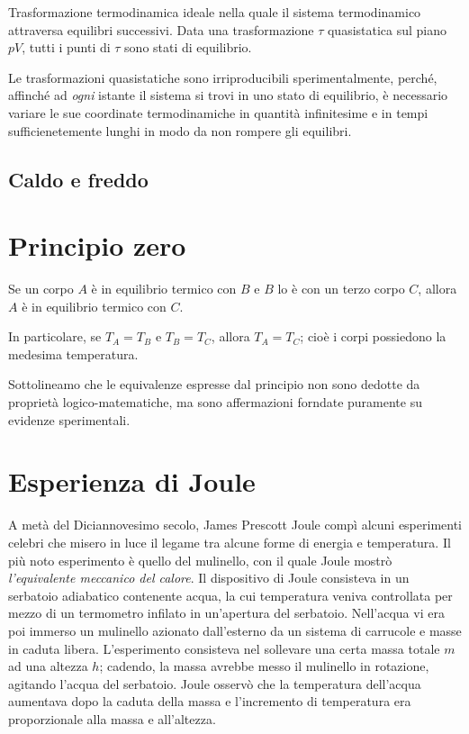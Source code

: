 \begin{tcolorbox}[colback = yellow!30, colframe = yellow!30!black, title = {Trasformazione quasistatica}]
    Trasformazione termodinamica ideale nella quale il sistema termodinamico
    attraversa equilibri successivi. Data una trasformazione $\tau$ quasistatica
    sul piano $pV$, tutti i punti di $\tau$ sono stati di equilibrio.
\end{tcolorbox}

\noindent Le trasformazioni quasistatiche sono irriproducibili sperimentalmente,
perché, affinché ad \textit{ogni} istante il sistema si trovi in uno stato
di equilibrio, è necessario variare le sue coordinate termodinamiche in
quantità infinitesime e in tempi sufficienetemente lunghi in modo da non
rompere gli equilibri.




\subsection{Caldo e freddo}

\section{Principio zero}
\begin{tcolorbox}[colback = red!30, colframe = red!30!black, title = {Primo zero della termodinamica}]
Se un corpo $A$ è in equilibrio termico con $B$ e $B$ lo è con un terzo
corpo $C$, allora $A$ è in equilibrio termico con $C$.

In particolare, se $T_A = T_B$ e $T_B = T_C$, allora $T_A = T_C$; cioè
i corpi possiedono la medesima temperatura.
\end{tcolorbox}

\noindent Sottolineamo che le equivalenze espresse dal principio non
sono dedotte da proprietà logico-matematiche, ma sono affermazioni
forndate puramente su evidenze sperimentali.


\section{Esperienza di Joule}
A metà del Diciannovesimo secolo, James Prescott Joule compì alcuni
esperimenti celebri che misero in luce il legame tra alcune forme di
energia e temperatura. Il più noto esperimento è quello del mulinello,
con il quale Joule mostrò \textit{l'equivalente meccanico del calore}.
Il dispositivo di Joule consisteva in un serbatoio adiabatico contenente
acqua, la cui temperatura veniva controllata per mezzo di un termometro
infilato in un'apertura del serbatoio. Nell'acqua vi era poi immerso
un mulinello azionato dall'esterno da un sistema di carrucole e masse
in caduta libera. L'esperimento consisteva nel sollevare una certa
massa totale $m$ ad una altezza $h$; cadendo, la massa avrebbe messo
il mulinello in rotazione, agitando l'acqua del serbatoio. Joule
osservò che la temperatura dell'acqua aumentava dopo la caduta della
massa e l'incremento di temperatura era proporzionale alla massa e all'altezza.

